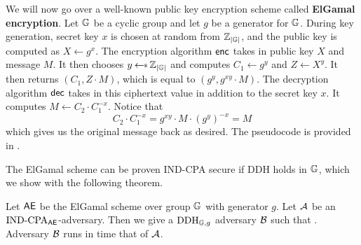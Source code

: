 We will now go over a well-known public key encryption scheme called \textbf{ElGamal encryption}. Let $\mathbb{G}$ be a cyclic group and let $g$ be a generator for $\mathbb{G}$. During key generation, secret key $x$ is chosen at random from ${{\mathbb Z}}_{|\mathbb{G}|}$, and the public key is computed as $X \gets g^x$. The encryption algorithm ${\sf enc}$ takes in public key $X$ and message $M$. It then chooses $y\getsr \Z_{|\group|}$ and computes $C_1 \gets g^y$ and $Z \gets X^y$. It then returns $(C_1, Z \cdot M)$, which is equal to $(g^y, g^{xy} \cdot M)$. The decryption algorithm ${\sf dec}$ takes in this ciphertext value in addition to the secret key $x$. It computes $M \gets C_2 \cdot C_1^{-x}$. Notice that
\begin{equation*}
	C_2 \cdot C_1^{-x} = g^{xy} \cdot M \cdot (g^y)^{-x} = M
\end{equation*}
which gives us the original message back as desired. The pseudocode is provided in .

The ElGamal scheme can be proven IND-CPA secure if DDH holds in $\mathbb{G}$, which we show with the following theorem. 

\begin{theorem}
\label{proof:elgamal}
	Let $\textsf{AE}$ be the ElGamal scheme over group $\mathbb{G}$ with generator $g$. 
	Let ${\mathcal A}$ be an $\textnormal{IND-CPA}_{\textsf{AE}}$-adversary. Then we give a $\textnormal{DDH}_{\mathbb{G},g}$ 
	adversary ${\mathcal B}$ such that 
	\bnm
	\AdvINDCPA{\AEnc}{\advA} \cdotsm {} \;.
	\enm
	Adversary ${\mathcal B}$ runs in time that of ${\mathcal A}$. 
\end{theorem} 
	
